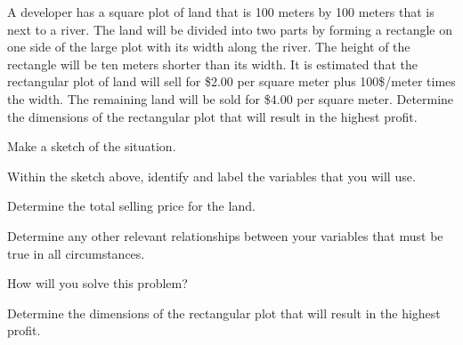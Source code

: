 \begin{problem}
  \item A developer has a square plot of land that is 100 meters by 100
    meters that is next to a river. The land will be divided into two
    parts by forming a rectangle on one side of the large plot with its
    width along the river. The height of the rectangle will be ten
    meters shorter than its width. It is estimated that the rectangular
    plot of land will sell for \$2.00 per square meter plus 100\$/meter
    times the width. The remaining land will be sold for \$4.00 per
    square meter.  Determine the dimensions of the rectangular plot that
    will result in the highest profit.
    \begin{subproblem}
      \item Make a sketch of the situation.
        \vfill
      \item Within the sketch above, identify and label the variables
        that you will use.
      \item Determine the total selling price for the land.
        \vfill
      \item Determine any other relevant relationships between your variables that must be true in all circumstances.
        \vfill
      \item How will you solve this problem?
        \vfill
      \item Determine the dimensions of the rectangular plot that will
        result in the highest profit.
        \vfill
        \vfill
    \end{subproblem}

\end{problem}

\postClass

